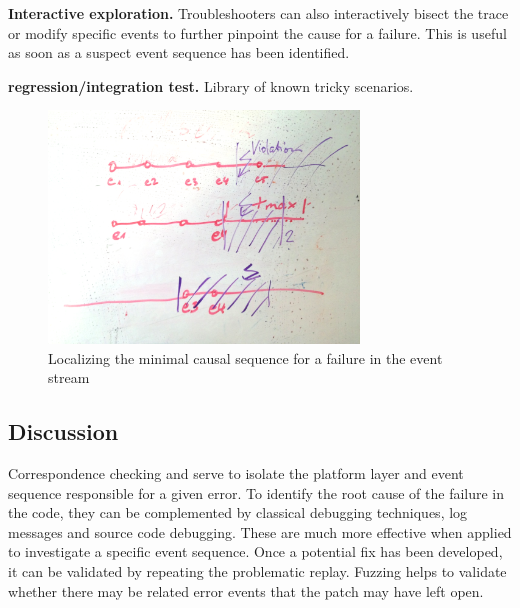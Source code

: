 \textbf{Interactive exploration.} Troubleshooters can also interactively bisect
the trace or modify specific events to further pinpoint the cause for a failure.
This is useful as soon as a suspect event sequence has been identified.

\textbf{regression/integration test.} Library of known tricky scenarios.

\begin{figure}[t]
    \includegraphics[width=3.25in]{../diagrams/approach/localizing}
    \caption[]{\label{fig:localizing} Localizing the minimal causal sequence for a failure in the 
    event stream}
\end{figure}



\subsection{Discussion}
Correspondence checking and \simulator{} serve to isolate the platform layer and
event sequence responsible for a given error. To identify the root cause of
the failure in the code, they can be complemented by classical debugging
techniques,\ie{} log messages and source code debugging. These are much more
effective when applied to investigate a specific event sequence. Once a
potential fix has been developed, it can be validated by repeating the
problematic replay. Fuzzing helps to validate whether there may be
related error events that the patch may have left open.

